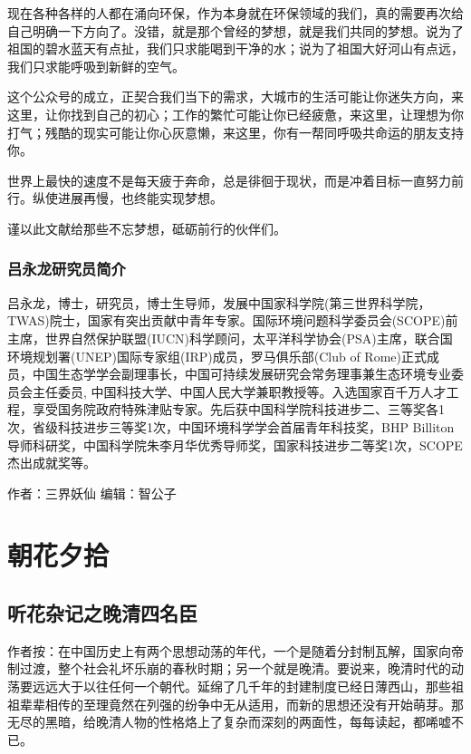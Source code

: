 \documentclass[]{book}
\begin{document}
现在各种各样的人都在涌向环保，作为本身就在环保领域的我们，真的需要再次给自己明确一下方向了。没错，就是那个曾经的梦想，就是我们共同的梦想。说为了祖国的碧水蓝天有点扯，我们只求能喝到干净的水；说为了祖国大好河山有点远，我们只求能呼吸到新鲜的空气。

这个公众号的成立，正契合我们当下的需求，大城市的生活可能让你迷失方向，来这里，让你找到自己的初心；工作的繁忙可能让你已经疲惫，来这里，让理想为你打气；残酷的现实可能让你心灰意懒，来这里，你有一帮同呼吸共命运的朋友支持你。

世界上最快的速度不是每天疲于奔命，总是徘徊于现状，而是冲着目标一直努力前行。纵使进展再慢，也终能实现梦想。

谨以此文献给那些不忘梦想，砥砺前行的伙伴们。

\subsection{吕永龙研究员简介}

吕永龙，博士，研究员，博士生导师，发展中国家科学院(第三世界科学院，TWAS)院士，国家有突出贡献中青年专家。国际环境问题科学委员会(SCOPE)前主席，世界自然保护联盟(IUCN)科学顾问，太平洋科学协会(PSA)主席，联合国环境规划署(UNEP)国际专家组(IRP)成员，罗马俱乐部(Club
of
Rome)正式成员，中国生态学学会副理事长，中国可持续发展研究会常务理事兼生态环境专业委员会主任委员,
中国科技大学、中国人民大学兼职教授等。入选国家百千万人才工程，享受国务院政府特殊津贴专家。先后获中国科学院科技进步二、三等奖各1次，省级科技进步三等奖1次，中国环境科学学会首届青年科技奖，BHP
Billiton导师科研奖，中国科学院朱李月华优秀导师奖，国家科技进步二等奖1次，SCOPE杰出成就奖等。

作者：三界妖仙 编辑：智公子

\chapter{朝花夕拾}

\section{听花杂记之晚清四名臣}

作者按：在中国历史上有两个思想动荡的年代，一个是随着分封制瓦解，国家向帝制过渡，整个社会礼坏乐崩的春秋时期；另一个就是晚清。要说来，晚清时代的动荡要远远大于以往任何一个朝代。延绵了几千年的封建制度已经日薄西山，那些祖祖辈辈相传的至理竟然在列强的纷争中无从适用，而新的思想还没有开始萌芽。那无尽的黑暗，给晚清人物的性格烙上了复杂而深刻的两面性，每每读起，都唏嘘不已。
\end{document}
